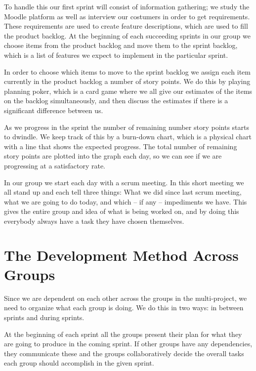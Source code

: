 To handle this our first sprint will consist of information gathering; we study the Moodle platform as well as interview our costumers in order to get requirements.
These requirements are used to create feature descriptions, which are used to fill the product backlog.
At the beginning of each succeeding sprints in our group we choose items from the product backlog and move them to the sprint backlog, which is a list of features we expect to implement in the particular sprint.

In order to choose which items to move to the sprint backlog we assign each item currently in the product backlog a number of story points.
We do this by playing planning poker, which is a card game where we all give our estimates of the items on the backlog simultaneously, and then discuss the estimates if there is a significant difference between us.

As we progress in the sprint the number of remaining number story points starts to dwindle. 
We keep track of this by a burn-down chart, which is a physical chart with a line that shows the expected progress.
The total number of remaining story points are plotted into the graph each day, so we can see if we are progressing at a satisfactory rate.

In our group we start each day with a scrum meeting.
In this short meeting we all stand up and each tell three things: What we did since last scrum meeting, what we are going to do today, and which -- if any -- impediments we have.
This gives the entire group and idea of what is being worked on, and by doing this everybody always have a task they have chosen themselves.

\section{The Development Method Across Groups} %
Since we are dependent on each other across the groups in the multi-project, we need to organize what each group is doing.
We do this in two ways: in between sprints and during sprints.

At the beginning of each sprint all the groups present their plan for what they are going to produce in the coming sprint.
If other groups have any dependencies, they communicate these and the groups collaboratively decide the overall tasks each group should accomplish in the given sprint.

